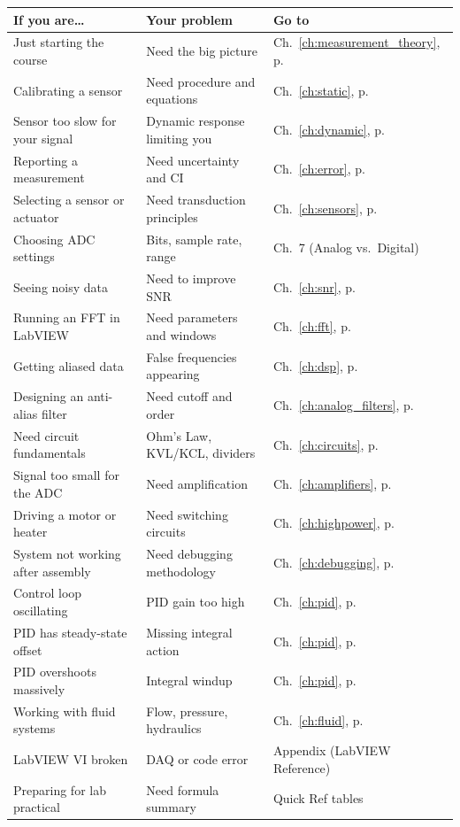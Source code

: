 \documentclass[11pt,letterpaper,twoside,openany]{book}
\begin{document}
\begin{center}\small
\begin{tabularx}{\textwidth}{l X l}
\toprule
\textbf{If you are\ldots} & \textbf{Your problem} & \textbf{Go to} \\
\midrule
Just starting the course & Need the big picture & Ch.~\ref{ch:measurement_theory}, p.\,\pageref{ch:measurement_theory} \\
Calibrating a sensor & Need procedure and equations & Ch.~\ref{ch:static}, p.\,\pageref{ch:static} \\
Sensor too slow for your signal & Dynamic response limiting you & Ch.~\ref{ch:dynamic}, p.\,\pageref{ch:dynamic} \\
Reporting a measurement & Need uncertainty and CI & Ch.~\ref{ch:error}, p.\,\pageref{ch:error} \\
Selecting a sensor or actuator & Need transduction principles & Ch.~\ref{ch:sensors}, p.\,\pageref{ch:sensors} \\
Choosing ADC settings & Bits, sample rate, range & Ch.~7 (Analog vs.\ Digital) \\
Seeing noisy data & Need to improve SNR & Ch.~\ref{ch:snr}, p.\,\pageref{ch:snr} \\
Running an FFT in LabVIEW & Need parameters and windows & Ch.~\ref{ch:fft}, p.\,\pageref{ch:fft} \\
Getting aliased data & False frequencies appearing & Ch.~\ref{ch:dsp}, p.\,\pageref{ch:dsp} \\
Designing an anti-alias filter & Need cutoff and order & Ch.~\ref{ch:analog_filters}, p.\,\pageref{ch:analog_filters} \\
Need circuit fundamentals & Ohm's Law, KVL/KCL, dividers & Ch.~\ref{ch:circuits}, p.\,\pageref{ch:circuits} \\
Signal too small for the ADC & Need amplification & Ch.~\ref{ch:amplifiers}, p.\,\pageref{ch:amplifiers} \\
Driving a motor or heater & Need switching circuits & Ch.~\ref{ch:highpower}, p.\,\pageref{ch:highpower} \\
System not working after assembly & Need debugging methodology & Ch.~\ref{ch:debugging}, p.\,\pageref{ch:debugging} \\
Control loop oscillating & PID gain too high & Ch.~\ref{ch:pid}, p.\,\pageref{ch:pid} \\
PID has steady-state offset & Missing integral action & Ch.~\ref{ch:pid}, p.\,\pageref{ch:pid} \\
PID overshoots massively & Integral windup & Ch.~\ref{ch:pid}, p.\,\pageref{ch:pid} \\
Working with fluid systems & Flow, pressure, hydraulics & Ch.~\ref{ch:fluid}, p.\,\pageref{ch:fluid} \\
LabVIEW VI broken & DAQ or code error & Appendix (LabVIEW Reference) \\
Preparing for lab practical & Need formula summary & Quick Ref tables \\
\bottomrule
\end{tabularx}
\end{center}
\end{document}
